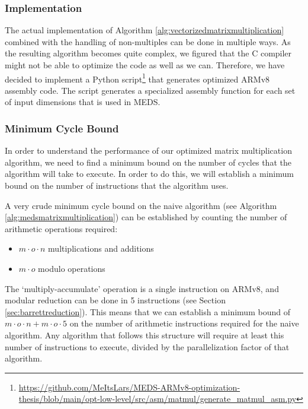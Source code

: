 \documentclass[11pt,a4paper]{report}
\theoremstyle{definition}
\begin{document}
\subsubsection{Implementation}
The actual implementation of Algorithm \ref{alg:vectorizedmatrixmultiplication} combined with the handling of non-multiples can be done in multiple ways. As the resulting algorithm becomes quite complex, we figured that the C compiler might not be able to optimize the code as well as we can. Therefore, we have decided to implement a Python script\footnote{\url{https://github.com/MeItsLars/MEDS-ARMv8-optimization-thesis/blob/main/opt-low-level/src/asm/matmul/generate\_matmul\_asm.py}} that generates optimized ARMv8 assembly code. The script generates a specialized assembly function for each set of input dimensions that is used in MEDS.

\subsubsection{Minimum Cycle Bound}
In order to understand the performance of our optimized matrix multiplication algorithm, we need to find a minimum bound on the number of cycles that the algorithm will take to execute. In order to do this, we will establish a minimum bound on the number of instructions that the algorithm uses.

A very crude minimum cycle bound on the naive algorithm (see Algorithm \ref{alg:medsmatrixmultiplication}) can be established by counting the number of arithmetic operations required:
\begin{itemize}
  \item $m \cdot o \cdot n$ multiplications and additions
  \item $m \cdot o$ modulo operations
\end{itemize}
The `multiply-accumulate' operation is a single instruction on ARMv8, and modular reduction can be done in 5 instructions (see Section \ref{sec:barrettreduction}). This means that we can establish a minimum bound of $m \cdot o \cdot n + m \cdot o \cdot 5$ on the number of arithmetic instructions required for the naive algorithm. Any algorithm that follows this structure will require at least this number of instructions to execute, divided by the parallelization factor of that algorithm.
\end{document}
